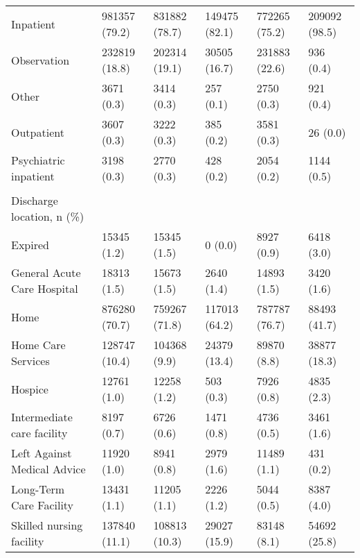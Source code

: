 \begin{adjustbox}{width={\textwidth},totalheight={\textheight},keepaspectratio,frame,padding=0ex 0ex -910ex 0ex}
{\begin{tabular}{L{20em}C{10em}C{10em}C{10em}C{10em}C{10em}}
  \hspace{3mm} Inpatient & 981357 (79.2) & 831882 (78.7) & 149475 (82.1) & 772265 (75.2) & 209092 (98.5)\\
  \hspace{3mm} Observation & 232819 (18.8) & 202314 (19.1) & 30505 (16.7) & 231883 (22.6) & 936 (0.4)\\
  \hspace{3mm} Other & 3671 (0.3) & 3414 (0.3) & 257 (0.1) & 2750 (0.3) & 921 (0.4)\\
  \hspace{3mm} Outpatient & 3607 (0.3) & 3222 (0.3) & 385 (0.2) & 3581 (0.3) & 26 (0.0)\\
  \hspace{3mm} Psychiatric inpatient & 3198 (0.3) & 2770 (0.3) & 428 (0.2) & 2054 (0.2) & 1144 (0.5)\\
  &  &  &  &  &  \\
Discharge location, n (\%) & &    &     &        &         \\
 \hspace{3mm} Expired & 15345 (1.2) & 15345 (1.5) & 0 (0.0) & 8927 (0.9) & 6418 (3.0)\\
  \hspace{3mm} General Acute Care Hospital & 18313 (1.5) & 15673 (1.5) & 2640 (1.4) & 14893 (1.5) & 3420 (1.6)\\
  \hspace{3mm} Home & 876280 (70.7) & 759267 (71.8) & 117013 (64.2) & 787787 (76.7) & 88493 (41.7)\\
  \hspace{3mm} Home Care Services & 128747 (10.4) & 104368 (9.9) & 24379 (13.4) & 89870 (8.8) & 38877 (18.3)\\
  \hspace{3mm} Hospice & 12761 (1.0) & 12258 (1.2) & 503 (0.3) & 7926 (0.8) & 4835 (2.3)\\
  \hspace{3mm} Intermediate care facility & 8197 (0.7) & 6726 (0.6) & 1471 (0.8) & 4736 (0.5) & 3461 (1.6)\\
  \hspace{3mm} Left Against Medical Advice & 11920 (1.0) & 8941 (0.8) & 2979 (1.6) & 11489 (1.1) & 431 (0.2)\\
  \hspace{3mm} Long-Term Care Facility & 13431 (1.1) & 11205 (1.1) & 2226 (1.2) & 5044 (0.5) & 8387 (4.0)\\
  \hspace{3mm} Skilled nursing facility & 137840 (11.1) & 108813 (10.3) & 29027 (15.9) & 83148 (8.1) & 54692 (25.8)\\

\end{tabular}}
\end{adjustbox}
